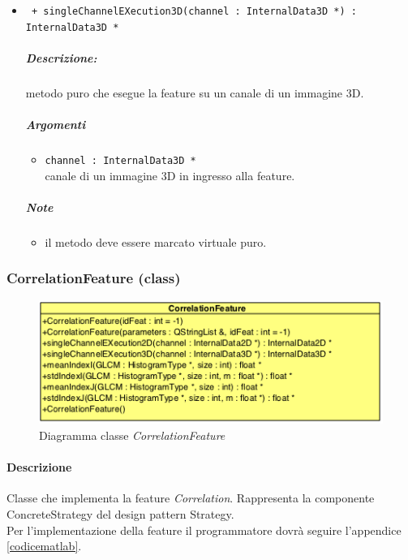 \begin{itemize}
	\item \color{blue}\verb! + singleChannelEXecution3D(channel : InternalData3D *) : InternalData3D *!
		\color{black}
		\subparagraph{Descrizione:} metodo puro che esegue la feature su un canale di un immagine 3D.
		\subparagraph{Argomenti}
			\begin{itemize}
				\item \color{RoyalPurple} \verb!channel : InternalData3D * ! \\ 
				\color{black} canale di un immagine 3D in ingresso alla feature.		
			\end{itemize}
		\subparagraph{Note}
			\begin{itemize}
				\item il metodo deve essere marcato virtuale puro.
			\end{itemize}
			
	\end{itemize}
	
\color{black}
\pagebreak
\subsubsection{CorrelationFeature (class)}
\label{CorrelationFeature}
\begin{figure}[!h]
\centering
			\includegraphics[scale=1]{./Content/Immagini/modelCore/CorrelationFeature.png}
			\caption{Diagramma classe \textsl{CorrelationFeature}}
			\label{correlationFeature_img}
\end{figure}

\paragraph{Descrizione \\} Classe che implementa la feature\g{} \textit{Correlation}. Rappresenta la componente ConcreteStrategy del design pattern\g{} Strategy.
\\Per l'implementazione della feature\g{} il programmatore dovrà seguire l'appendice \ref{codicematlab}.

